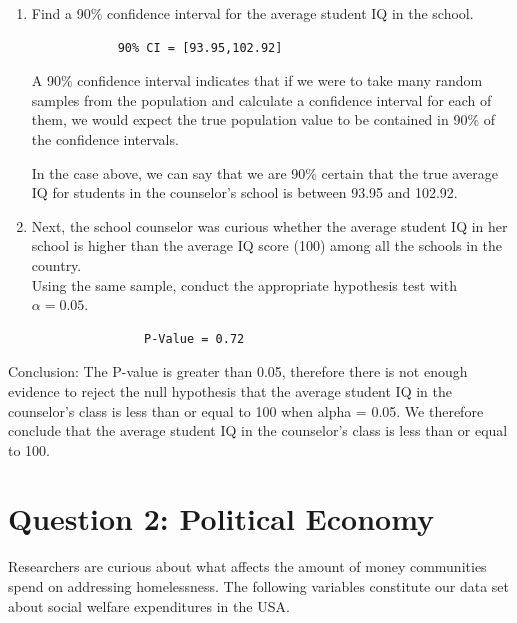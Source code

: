 \documentclass[12pt,letterpaper]{article}
\begin{document}
	\begin{enumerate}
		\item Find a 90\% confidence interval for the average student IQ in the school.\\
		
		\begin{Verbatim}
			90% CI = [93.95,102.92]
		\end{Verbatim}
		\noindent
		A 90\% confidence interval indicates that if we were to take many random samples from the population and calculate a confidence interval for each of them, we would expect the true population value to be contained in 90\% of the confidence intervals.
		
		In the case above, we can say that we are 90\% certain that the true average IQ for students in the counselor's school is between 93.95 and 102.92.
		
		\item Next, the school counselor was curious  whether  the average student IQ in her school is higher than the average IQ score (100) among all the schools in the country.\\ 
		
		\noindent Using the same sample, conduct the appropriate hypothesis test with $\alpha=0.05$.
	\end{enumerate}
	
	\begin{Verbatim}
			       P-Value = 0.72
	\end{Verbatim}
	Conclusion: 
	The P-value is greater than 0.05, therefore there is not enough evidence to reject the null hypothesis that the average student IQ in the counselor's class is less than or equal to 100 when alpha = 0.05. We therefore conclude that the average student IQ in the counselor's class is less than or equal to 100.
	
	
	\newpage
	
	\section*{Question 2: Political Economy}
	
	\noindent Researchers are curious about what affects the amount of money communities spend on addressing homelessness. The following variables constitute our data set about social welfare expenditures in the USA. \\
	\vspace{.5cm}
	
\end{document}
